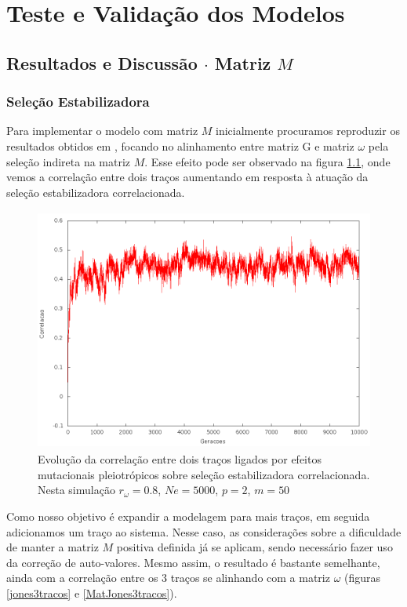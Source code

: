\pagestyle{empty}
\cleardoublepage
\pagestyle{fancy}
\chapter{Teste e Validação dos Modelos}\label{cap3}

\section{Resultados e Discussão $\cdot$ Matriz $M$}\label{cap3:ModelM}

\subsection{Seleção Estabilizadora}

Para implementar o modelo com matriz $M$ inicialmente procuramos
reproduzir os resultados obtidos em \cite{Jones2007}, focando no
alinhamento entre matriz G e matriz $\omega$ pela seleção indireta na
matriz $M$. 
Esse efeito pode ser observado na figura \ref{jones2tracos}, onde vemos
a correlação entre dois traços aumentando em resposta à atuação da
seleção estabilizadora correlacionada.  

\begin{center}
\begin{figure}[htbp]
  \includegraphics[width=150mm, height=80mm]{figuras/jones2tracos.png}
  \caption{Evolução da correlação entre dois traços ligados por efeitos
  mutacionais pleiotrópicos sobre seleção estabilizadora correlacionada.
  Nesta simulação $r_\omega=0.8$, $Ne=5000$, $p=2$, $m=50$}
  \label{jones2tracos}
\end{figure}
\end{center}

Como nosso objetivo é expandir a modelagem para mais traços, em seguida
adicionamos um traço ao sistema. 
Nesse caso, as considerações sobre a dificuldade de manter a matriz $M$
positiva definida já se aplicam, sendo necessário fazer uso da correção
de auto-valores. 
Mesmo assim, o resultado é bastante semelhante, ainda com a correlação
entre os 3 traços se alinhando com a matriz $\omega$ (figuras
\ref{jones3tracos} e \ref{MatJones3tracos}). 


